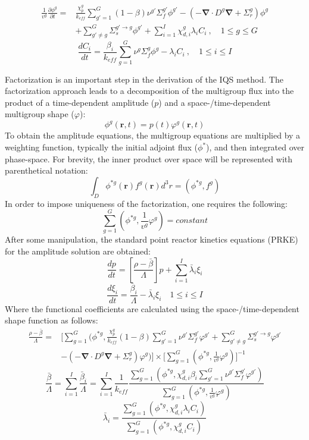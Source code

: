 \documentclass{anstrans}
\renewcommand{\vec}[1]{\bm{#1}} %
\newcommand{\bs}[1]{\mathbf{#1}}
\renewcommand{\div}{\bs{\nabla}\! \cdot \!}
\newcommand{\grad}{\bs{\nabla}}
\newcommand{\keff}{k_\textit{eff}}
\newcommand{\be}{\begin{equation}}
\newcommand{\ee}{\end{equation}}
\begin{document}
\begin{align}
\frac{1}{v^g} \frac{\partial \phi^g }{\partial t} =& \frac{\chi_p^g}{\keff} \sum_{g'=1}^G (1-\beta) \nu^{g'} \Sigma_f^{g'} \phi^{g'} -  \left( -\div D^g \grad  + \Sigma_r^g \right) \phi^g  \nonumber \\
&  + \sum_{g'\neq g}^G\Sigma_s^{g'\to g} \phi^{g'}  + \sum_{i=1}^I\chi_{d,i}^g\lambda_i C_i \ , \quad 1 \le g \le G 
\label{eq:flux}
\end{align}
\be
\frac{dC_i}{dt} = \frac{\beta_i}{k_{eff}}\sum_{g=1}^G\nu^{g} \Sigma_f^g \phi^{g} - \lambda_i C_i \ , \quad 1 \le i \le I 
\label{eq:precursor}
\ee

Factorization is an important step in the derivation of the IQS method. The factorization approach leads to a decomposition of the multigroup flux into the product of a time-dependent amplitude ($p$) and a space-/time-dependent multigroup shape ($\varphi$):
\be
\phi^g(\vec{r},t)=p(t)\varphi^g(\vec{r},t)
\ee
To obtain the amplitude equations, the multigroup equations are multiplied by a weighting function, typically the initial adjoint flux ($\phi^*$), and then integrated over phase-space.  For brevity, the inner product over space will be represented with parenthetical notation:
\be
\int_D\phi^{*g}(\vec{r})f^g(\vec{r})d^3r=\left(\phi^{*g},f^g\right)
\ee
In order to impose uniqueness of the factorization, one requires the following:
\be
\sum_{g=1}^G\left(\phi^{*g},\frac{1}{v^g}\varphi^g\right) = \textit{constant}
\ee
After some manipulation, the standard point reactor kinetics equations (PRKE) for the amplitude solution are obtained:
\be
\frac{dp}{dt}=\left[\frac{\rho-\bar{\beta}}{\Lambda}\right]p+\sum_{i=1}^I\bar{\lambda}_i\xi_i
\ee
\be
\frac{d\xi_i}{dt}=\frac{\bar{\beta}_i}{\Lambda}-\bar{\lambda}_i\xi_i \quad 1 \le i \le I 
\ee
Where the functional coefficients are calculated using the space-/time-dependent shape function as follows:
\begin{align}
\frac{\rho-\bar{\beta}}{\Lambda}=&\Bigg[\sum_{g=1}^G \bigg(\phi^{*g},\frac{\chi_p^g}{k_{eff}}(1-\beta)\sum_{g'=1}^G \nu^{g'} \Sigma_f^{g'}\varphi^{g'} + \sum_{g'\neq g}^G\Sigma_s^{g'\to g} \varphi^{g'} \nonumber \\
& -\left( -\div D^g \grad  + \Sigma_r^g \right)\varphi^g \bigg)\Bigg] \times \Bigg[\sum_{g=1}^G\left(\phi^{*g},\frac{1}{v^g}\varphi^g\right)\Bigg]^{-1}
\label{eq:rmb}
\end{align}
\be
\frac{\bar{\beta}}{\Lambda}=\sum_{i=1}^I\frac{\bar{\beta}_i}{\Lambda}=\sum_{i=1}^I\frac{1}{k_{eff}}\frac{\sum_{g=1}^G(\phi^{*g}, \chi_{d,i}^g\beta_i\sum_{g'=1}^G\nu^{g'} \Sigma_f^{g' }\varphi^{g'})}{\sum_{g=1}^G\left(\phi^{*g},\frac{1}{v^g}\varphi^g\right)}
\label{eq:b}
\ee
\be
\bar{\lambda}_i=\frac{\sum_{g=1}^G(\phi^{*g},\chi_{d,i}^g\lambda_i C_i)}{\sum_{g=1}^G(\phi^{*g},\chi_{d,i}^gC_i)}
\label{eq:l}
\ee
\end{document}
